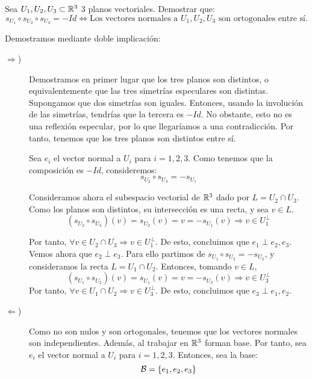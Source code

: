 \begin{ejercicio}
    Sea $U_1,U_2,U_3\subset \mathbb{R}^3$ 3 planos vectoriales. Demostrar que:
    \begin{equation*}
        s_{U_1}\circ s_{U_2} \circ s_{U_3}=-Id \Longleftrightarrow \text{Los vectores normales a $U_1, U_2, U_3$ son ortogonales entre sí.}
    \end{equation*}

    Demostramos mediante doble implicación:
    \begin{description}
        \item [$\Longrightarrow$)] Demostramos en primer lugar que los tres planos son distintos, o equivalentemente que las tres simetrías especulares son distintas. Supongamos que dos simetrías son iguales. Entonces, usando la involución de las simetrías, tendrías que la tercera es $-Id$. No obstante, esto no es una reflexión especular, por lo que llegaríamos a una contradicción. Por tanto, tenemos que los tres planos son distintos entre sí.

        Sea $e_i$ el vector normal a $U_i$ para $i=1,2,3$. Como tenemos que la composición es $-Id$, consideremos:
        \begin{equation*}
            s_{U_2} \circ s_{U_3}=-s_{U_1}
        \end{equation*}
    
        Consideramos ahora el subespacio vectorial de $\mathbb{R}^3$ dado por $L=U_2\cap U_3$. Como los planos son distintos, su intersección es una recta, y sea $v\in L$.
        \begin{equation*}
            (s_{U_2} \circ s_{U_3})(v) = s_{U_2}(v) = v = -s_{U_1}(v) \Longrightarrow v \in U_1^\perp
        \end{equation*}
    
        Por tanto, $\forall v\in U_2\cap U_3\Longrightarrow v\in U_1^\perp$. De esto, concluimos que $e_1\perp e_2,e_3$.  Vemos ahora que $e_2\perp e_3$. Para ello partimos de $s_{U_1} \circ s_{U_2}=-s_{U_3}$, y consideramos la recta $L=U_1\cap U_2$. Entonces, tomando $v\in L$,
        \begin{equation*}
            (s_{U_1} \circ s_{U_2})(v) = s_{U_1}(v) = v = -s_{U_3}(v) \Longrightarrow v \in U_3^\perp
        \end{equation*}
        Por tanto, $\forall v\in U_1\cap U_2\Longrightarrow v\in U_3^\perp$. De esto, concluimos que $e_3\perp e_1,e_2$.


        \item [$\Longleftarrow$)] Como no son nulos y son ortogonales, tenemos que los vectores normales son independientes. Además, al trabajar en $\mathbb{R}^3$ forman base. Por tanto, sea $e_i$ el vector normal a $U_i$ para $i=1,2,3$. Entonces, sea la base:
        \begin{equation*}
            \mathcal{B} = \{e_1, e_2, e_3\}
        \end{equation*}


\end{description}
\end{ejercicio}
